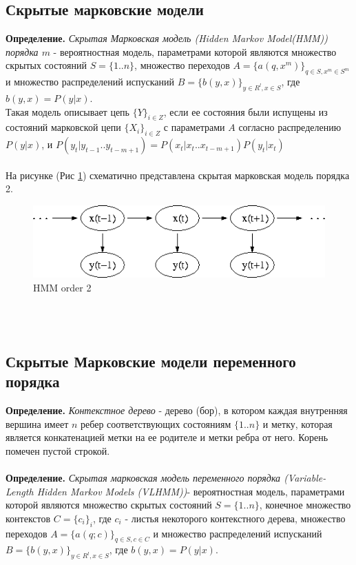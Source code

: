 \documentclass{matmex-diploma-custom}
\begin{document}
\subsection{Скрытые марковские модели}
\textbf{Определение.} \emph{Скрытая Марковская модель (Hidden Markov Model(HMM)) порядка $ m $} - вероятностная модель, параметрами которой являются множество скрытых состояний $ S = \{1..n\} $, множество переходов $ A = \{a(q, x^{m})\}_{q \in S, x^{m} \in S^{m}}$ и множество распределений испусканий $ B = \{b(y,x)\}_{y \in R^{l}, x \in S}$, где $ b(y, x) = P(y|x)$. 
\\
Такая модель описывает цепь $\{Y\}_{i \in Z}$, если ее состояния были испущены из состояний марковской цепи $\{X_{i}\}_{i \in Z}$ с параметрами $ A $ согласно распределению $ P(y|x) $, и $ P(y_{t}|y_{t-1}..y_{t-m+1}) = P(x_{t}|x_{t}..x_{t-m+1})P(y_t|x_t)$  
\\\\
На рисунке (Рис \ref{ris:image}) схематично представлена скрытая марковская модель порядка 2.
\\
\begin{figure}[hbtp]
\includegraphics[scale=0.4]{img/Hmm_temporal_bayesian_net.png}
\centering
\caption{HMM order 2}
\label{ris:image}
\end{figure}
\\\\
\subsection{Скрытые Марковские модели переменного порядка}
\textbf{Определение.} \textit{Контекстное дерево} - дерево (бор), в котором каждая внутренняя вершина имеет $ n $ ребер соответствующих состояниям $ \{1..n\} $ и метку, которая является конкатенацией метки на ее родителе и метки ребра от него. Корень помечен пустой строкой. 
\\\\
\textbf{Определение.} \textit{Скрытая марковская модель переменного порядка (Variable-Length Hidden Markov Models (VLHMM))}- вероятностная модель, параметрами которой являются множество скрытых состояний $ S = \{1..n\} $, конечное множество контекстов $ C=\{c_{i}\}_{i} $, где $ c_{i} $ - листья некоторого контекстного дерева, множество переходов $ A = \{a(q; c)\}_{q \in S, c \in C}$ и множество распределений испусканий $ B = \{b(y,x)\}_{y \in R^{l}, x \in S}$, где $ b(y, x) = P(y|x)$.  
\\\\\\
\end{document}
